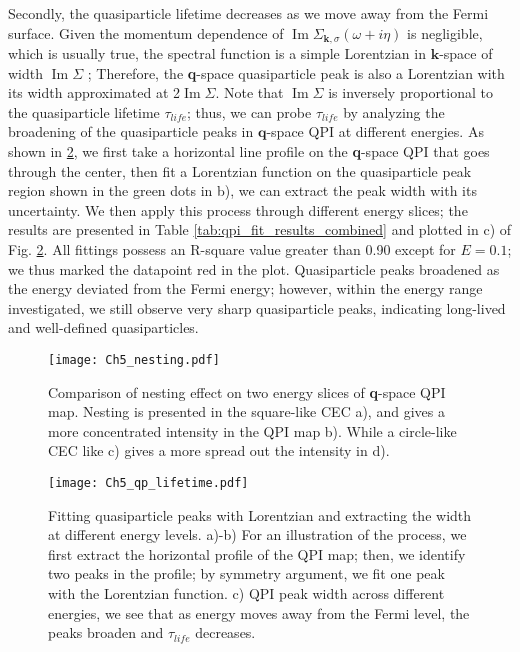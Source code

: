 Secondly, the quasiparticle lifetime decreases as we move away from the Fermi surface. Given the momentum dependence of $\operatorname{Im}{\Sigma_{\textbf{k},\sigma}(\omega+i \eta)}$ is negligible, which is usually true, the spectral function is a simple Lorentzian in $\textbf{k}$-space of width $\operatorname{Im}{\Sigma}$ \cite{wolfleQuasiparticlesCondensedMatter2018}; Therefore, the \textbf{q}-space quasiparticle peak is also a Lorentzian with its width approximated at 2$\operatorname{Im}{\Sigma}$. Note that $\operatorname{Im}{\Sigma}$ is inversely proportional to the quasiparticle lifetime $\tau_{life}$; thus, we can probe $\tau_{life}$ by analyzing the broadening of the quasiparticle peaks in $\textbf{q}$-space \ac{QPI} at different energies. As shown in \ref{fig:ch5qplifetime}, we first take a horizontal line profile on the \textbf{q}-space \ac{QPI} that goes through the center, then fit a Lorentzian function on the quasiparticle peak region shown in the green dots in b), we can extract the peak width with its uncertainty. We then apply this process through different energy slices; the results are presented in Table \ref{tab:qpi_fit_results_combined} and plotted in c) of Fig. \ref{fig:ch5qplifetime}. All fittings possess an R-square value greater than 0.90 except for $E=0.1$; we thus marked the datapoint red in the plot. Quasiparticle peaks broadened as the energy deviated from the Fermi energy; however, within the energy range investigated, we still observe very sharp quasiparticle peaks, indicating long-lived and well-defined quasiparticles. 



\begin{figure}
	\texttt{[image: Ch5\_nesting.pdf]} 
	\centering
	\caption{Comparison of nesting effect on two energy slices of \textbf{q}-space QPI map. Nesting is presented in the square-like \ac{CEC} a), and gives a more concentrated intensity in the QPI map b). While a circle-like \ac{CEC} like c) gives a more spread out the intensity in d).}
	\label{fig:ch5_nest}
\end{figure}


\begin{figure}
	\texttt{[image: Ch5\_qp\_lifetime.pdf]} 
	\centering
	\caption{Fitting quasiparticle peaks with Lorentzian and extracting the width at different energy levels. a)-b) For an illustration of the process, we first extract the horizontal profile of the QPI map; then, we identify two peaks in the profile; by symmetry argument, we fit one peak with the Lorentzian function. c) QPI peak width across different energies, we see that as energy moves away from the Fermi level, the peaks broaden and $\tau_{life}$ decreases.}
	\label{fig:ch5qplifetime}
\end{figure}


